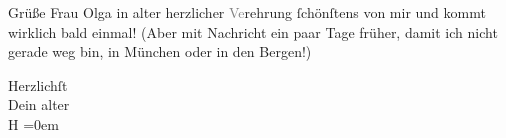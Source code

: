 \pstart
           Grüße Frau Olga in alter herzlicher
            \textcolor{gray}{Ve}rehrung{ }ſchönſtens von mir und kommt wirklich bald einmal! (Aber
          mit Nachricht ein paar Tage früher, damit ich nicht gerade weg bin, in München oder in den Bergen!)\pend
           
\pstart
           Herzlichſt{\\[\baselineskip]}Dein alter{\\[\baselineskip]}\spacefill\mbox{H}\pend
           \leftskip=0em{}\endnumbering{}  \newcommand{\dateiname}{L02204}\newcommand{\titel}{Hermann Bahr an Arthur Schnitzler, 10. 2. 1915}\newcommand{\editorInnen}{Herausgegeben von Martin Anton Müller}
